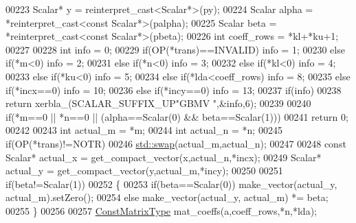 \begin{DoxyCode}
00223   Scalar* y = \textcolor{keyword}{reinterpret\_cast<}Scalar*\textcolor{keyword}{>}(py);
00224   Scalar alpha = *\textcolor{keyword}{reinterpret\_cast<}\textcolor{keyword}{const }Scalar*\textcolor{keyword}{>}(palpha);
00225   Scalar beta = *\textcolor{keyword}{reinterpret\_cast<}\textcolor{keyword}{const }Scalar*\textcolor{keyword}{>}(pbeta);
00226   \textcolor{keywordtype}{int} coeff\_rows = *kl+*ku+1;
00227 
00228   \textcolor{keywordtype}{int} info = 0;
00229        \textcolor{keywordflow}{if}(OP(*trans)==INVALID)                                        info = 1;
00230   \textcolor{keywordflow}{else} \textcolor{keywordflow}{if}(*m<0)                                                       info = 2;
00231   \textcolor{keywordflow}{else} \textcolor{keywordflow}{if}(*n<0)                                                       info = 3;
00232   \textcolor{keywordflow}{else} \textcolor{keywordflow}{if}(*kl<0)                                                      info = 4;
00233   \textcolor{keywordflow}{else} \textcolor{keywordflow}{if}(*ku<0)                                                      info = 5;
00234   \textcolor{keywordflow}{else} \textcolor{keywordflow}{if}(*lda<coeff\_rows)                                            info = 8;
00235   \textcolor{keywordflow}{else} \textcolor{keywordflow}{if}(*incx==0)                                                   info = 10;
00236   \textcolor{keywordflow}{else} \textcolor{keywordflow}{if}(*incy==0)                                                   info = 13;
00237   \textcolor{keywordflow}{if}(info)
00238     \textcolor{keywordflow}{return} xerbla\_(SCALAR\_SUFFIX\_UP\textcolor{stringliteral}{"GBMV "},&info,6);
00239 
00240   \textcolor{keywordflow}{if}(*m==0 || *n==0 || (alpha==Scalar(0) && beta==Scalar(1)))
00241     \textcolor{keywordflow}{return} 0;
00242 
00243   \textcolor{keywordtype}{int} actual\_m = *m;
00244   \textcolor{keywordtype}{int} actual\_n = *n;
00245   \textcolor{keywordflow}{if}(OP(*trans)!=NOTR)
00246     \hyperlink{endian_8c_a3ca5ecd34b04d6a243c054ac3a57f68d}{std::swap}(actual\_m,actual\_n);
00247 
00248   \textcolor{keyword}{const} Scalar* actual\_x = get\_compact\_vector(x,actual\_n,*incx);
00249   Scalar* actual\_y = get\_compact\_vector(y,actual\_m,*incy);
00250 
00251   \textcolor{keywordflow}{if}(beta!=Scalar(1))
00252   \{
00253     \textcolor{keywordflow}{if}(beta==Scalar(0)) make\_vector(actual\_y, actual\_m).setZero();
00254     \textcolor{keywordflow}{else}                make\_vector(actual\_y, actual\_m) *= beta;
00255   \}
00256 
00257   \hyperlink{group___core___module_class_eigen_1_1_map}{ConstMatrixType} mat\_coeffs(a,coeff\_rows,*n,*lda);

\end{DoxyCode}
